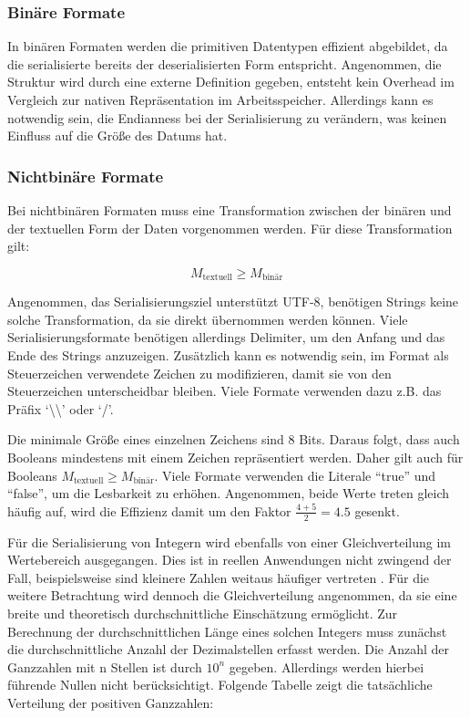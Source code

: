 \documentclass[ngerman]{seminarvorlage}
\begin{document}
\subsubsection{Binäre Formate}

In binären Formaten werden die primitiven Datentypen effizient abgebildet, da die serialisierte bereits der deserialisierten Form entspricht. Angenommen, die Struktur wird durch eine externe Definition gegeben, entsteht kein Overhead im Vergleich zur nativen Repräsentation im Arbeitsspeicher. Allerdings kann es notwendig sein, die Endianness bei der Serialisierung zu verändern, was keinen Einfluss auf die Größe des Datums hat.

\subsubsection{Nichtbinäre Formate}

Bei nichtbinären Formaten muss eine Transformation zwischen der binären und der textuellen Form der Daten vorgenommen werden. Für diese Transformation gilt:

$$ M_{\text{textuell}} \geq M_{\text{binär}} $$

Angenommen, das Serialisierungsziel unterstützt UTF-8, benötigen Strings keine solche Transformation, da sie direkt übernommen werden können. Viele Serialisierungsformate benötigen allerdings Delimiter, um den Anfang und das Ende des Strings anzuzeigen. Zusätzlich kann es notwendig sein, im Format als Steuerzeichen verwendete Zeichen zu modifizieren, damit sie von den Steuerzeichen unterscheidbar bleiben. Viele Formate verwenden dazu z.B. das Präfix `\textbackslash\textbackslash' oder `/'.

Die minimale Größe eines einzelnen Zeichens sind 8 Bits. Daraus folgt, dass auch Booleans mindestens mit einem Zeichen repräsentiert werden. Daher gilt auch für Booleans $ M_{\text{textuell}} \geq M_{\text{binär}} $. Viele Formate verwenden die Literale ``true'' und ``false'', um die Lesbarkeit zu erhöhen. Angenommen, beide Werte treten gleich häufig auf, wird die Effizienz damit um den Faktor $\frac{4 + 5}{2} = 4.5$ gesenkt.

Für die Serialisierung von Integern wird ebenfalls von einer Gleichverteilung im Wertebereich ausgegangen. Dies ist in reellen Anwendungen nicht zwingend der Fall, beispielsweise sind kleinere Zahlen weitaus häufiger vertreten \cite{berger2015introduction}. Für die weitere Betrachtung wird dennoch die Gleichverteilung angenommen, da sie eine breite und theoretisch durchschnittliche Einschätzung ermöglicht. Zur Berechnung der durchschnittlichen Länge eines solchen Integers muss zunächst die durchschnittliche Anzahl der Dezimalstellen erfasst werden. Die Anzahl der Ganzzahlen mit n Stellen ist durch $10^n$ gegeben. Allerdings werden hierbei führende Nullen nicht berücksichtigt. Folgende Tabelle zeigt die tatsächliche Verteilung der positiven Ganzzahlen:
\end{document}
